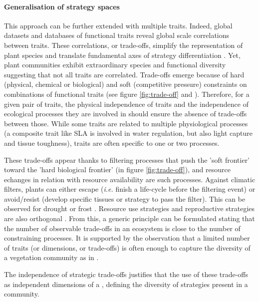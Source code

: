 \paragraph{Generalisation of strategy spaces}
This approach can be further extended with multiple traits. Indeed, global datasets and databases of functional traits reveal global scale correlations between traits. These correlations, or trade-offs, simplify the representation of plant species \parencite{diaz_global_2016} and translate fundamental axes of strategy differentiation \parencite{reich_world-wide_2014}. Yet, plant communities exhibit extraordinary species and functional diversity suggesting that not all traits are correlated. Trade-offs emerge because of hard (physical, chemical or biological) and soft (competitive pressure) constraints on combinations of functional traits (see figure \ref{fig:trade-off} and \citet{shipley_fundamental_2006}). Therefore, for a given pair of traits, the physical independence of traits and the independence of ecological processes they are involved in should ensure the absence of trade-offs between those. While some traits are related to multiple physiological processes (a composite trait like SLA is involved in water regulation, but also light capture and tissue toughness), traits are often specific to one or two processes.

These trade-offs appear thanks to filtering processes that push the 'soft frontier' toward the 'hard biological frontier' (in figure \ref{fig:trade-off}), and resource echanges in relation with resource availability are such processes. Against climatic filters, plants can either escape (\textit{i.e.} finish a life-cycle before the filtering event) or avoid/resist (develop specific tissues or strategy to pass the filter). This can be observed for drought \parencite{kooyers_evolution_2015} or frost \parencite{korner_alpine_2003}. Resource use strategies and reproductive strategies are also orthogonal \parencite{diaz_global_2016}. 
From this, a generic principle can be formulated stating that the number of observable trade-offs in an ecosystem is close to the number of constraining processes. It is supported by the observation that a limited number of traits (or dimensions, or trade-offs) is often enough to capture the diversity of a vegetation community as in \citet{laughlin_intrinsic_2014}.

The independence of strategic trade-offs justifies that the use of these trade-offs as independent dimensions of a , defining the diversity of strategies present in a community.

